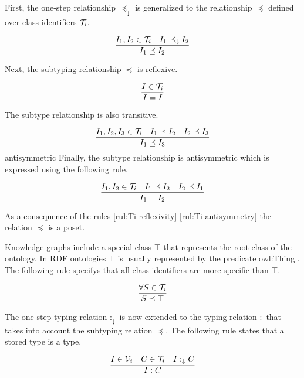 \documentclass[runningheads]{llncs}
\newcommand{\darr}{\downarrow}
\newcommand{\V}{{\cal V}}
\newcommand{\T}{{\cal T}}
\begin{document}
First, the one-step relationship $\preceq_\darr$ is generalized to the
relationship $\preceq$ defined over class identifiers $\T_i$.

\begin{equation}
\label{rul:Ic-extended}
\dfrac{I_1,I_2\in\T_i \quad I_1\preceq_\darr\/I_2}
      {I_1 \preceq I_2}
\end{equation}

Next, the subtyping relationship $\preceq$ is reflexive.

\begin{equation}
\label{rul:Ti-reflexivity}
\dfrac{I\in\T_i}
      {I=I}
\end{equation}

The subtype relationship is also transitive. 

\begin{equation}
\label{rul:Ti-transitivity}
\dfrac{I_1,I_2,I_3\in\T_i\quad\/I_1\preceq\/I_2\quad\/I_2\preceq\/I_3}
      {I_1\preceq\/I_3}   
\end{equation}
antisymmetric
Finally, the subtype relationship is antisymmetric which is expressed
using the following rule.

\begin{equation}
\label{rul:Ti-antisymmetry}
\dfrac{I_1,I_2\in\T_i \quad I_1\preceq\/I_2 \quad I_2\preceq\/I_1}
      {I_1=I_2}   
\end{equation}

As a consequence of the rules
\ref{rul:Ti-reflexivity}-\ref{rul:Ti-antisymmetry} the relation
$\preceq$ is a poset.

Knowledge graphs include a special class $\top$ that represents the
root class of the ontology. In RDF ontologies $\top$ is usually
represented by the predicate owl:Thing \cite{Hoffart2013}. The
following rule specifys that all class identifiers are more specific
than $\top$.

\begin{equation}
\dfrac{\forall\/S\in\T_i}
      {S\preceq\top}
\end{equation}

The one-step typing relation $:_\darr$ is now extended to the typing
relation $:$ that takes into account the subtyping relation $\preceq$.
The following rule states that a stored type is a type.

\begin{equation}
\dfrac{I\in\V_i\quad\/C\in\T_i\quad\/I:_\darr\/C}
      {I:C}
\end{equation}
\end{document}
